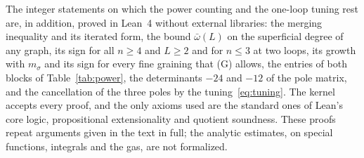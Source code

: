 \documentclass[aps,prd,10pt,twocolumn,superscriptaddress,nofootinbib,floatfix,longbibliography]{revtex4-2}
\begin{document}
The integer statements on which the power counting and the one-loop tuning rest are, in addition, proved in Lean~4 without external libraries: the merging inequality and its iterated form, the bound $\bar\omega(L)$ on the superficial degree of any graph, its sign for all $n\ge4$ and $L\ge2$ and for $n\le3$ at two loops, its growth with $m_\sigma$ and its sign for every fine graining that (G) allows, the entries of both blocks of Table~\ref{tab:power}, the determinants $-24$ and $-12$ of the pole matrix, and the cancellation of the three poles by the tuning~\eqref{eq:tuning}. The kernel accepts every proof, and the only axioms used are the standard ones of Lean's core logic, propositional extensionality and quotient soundness. These proofs repeat arguments given in the text in full; the analytic estimates, on special functions, integrals and the gas, are not formalized.
\end{document}
